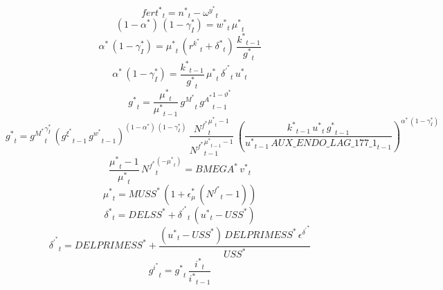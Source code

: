\begin{dmath}
{{fert^*}}_{t}={{n^*}}_{t}-{{\omega^y^*}}_{t}
\end{dmath}
\begin{dmath}
\left(1-{{\alpha^*}}\right)\, \left(1-{{\gamma_I^*}}\right)={{w^*}}_{t}\, {{\mu^*}}_{t}
\end{dmath}
\begin{dmath}
{{\alpha^*}}\, \left(1-{{\gamma_I^*}}\right)={{\mu^*}}_{t}\, \left({{r^k^*}}_{t}+{{\delta^*}}_{t}\right)\, \frac{{{k^*}}_{t-1}}{{{g^*}}_{t}}
\end{dmath}
\begin{dmath}
{{\alpha^*}}\, \left(1-{{\gamma_I^*}}\right)=\frac{{{k^*}}_{t-1}}{{{g^*}}_{t}}\, {{\mu^*}}_{t}\, {{\delta^\prime^*}}_{t}\, {{u^*}}_{t}
\end{dmath}
\begin{dmath}
{{g^*}}_{t}=\frac{{{\mu^*}}_{t}}{{{\mu^*}}_{t-1}}\, {{g^M^*}}_{t}\, {{g^A^*}}_{t-1}^{1-{{\vartheta^*}}}
\end{dmath}
\begin{dmath}
{{g^*}}_{t}={{g^M^*}}_{t}^{{{\gamma_I^*}}}\, \left({{g^{\xi}^*}}_{t-1}\, {{g^w^*}}_{t-1}\right)^{\left(1-{{\alpha^*}}\right)\, \left(1-{{\gamma_I^*}}\right)}\, \frac{{{N^f^*}}_{t}^{{{\mu^*}}_{t}-1}}{{{N^f^*}}_{t-1}^{{{\mu^*}}_{t-1}-1}}\, \left(\frac{{{k^*}}_{t-1}\, {{u^*}}_{t}\, {{g^*}}_{t-1}}{{{u^*}}_{t-1}\, {AUX\_ENDO\_LAG\_177\_1}_{t-1}}\right)^{{{\alpha^*}}\, \left(1-{{\gamma_I^*}}\right)}
\end{dmath}
\begin{dmath}
\frac{{{\mu^*}}_{t}-1}{{{\mu^*}}_{t}}\, {{N^f^*}}_{t}^{\left(-{{\mu^*}}_{t}\right)}={{BMEGA^*}}\, {{v^*}}_{t}
\end{dmath}
\begin{dmath}
{{\mu^*}}_{t}={{MUSS^*}}\, \left(1+{{\epsilon_{\mu}^*}}\, \left({{N^f^*}}_{t}-1\right)\right)
\end{dmath}
\begin{dmath}
{{\delta^*}}_{t}={{DELSS^*}}+{{\delta^\prime^*}}_{t}\, \left({{u^*}}_{t}-{{USS^*}}\right)
\end{dmath}
\begin{dmath}
{{\delta^\prime^*}}_{t}={{DELPRIMESS^*}}+\frac{\left({{u^*}}_{t}-{{USS^*}}\right)\, {{DELPRIMESS^*}}\, {{\epsilon^{\delta^{\prime}}^*}}}{{{USS^*}}}
\end{dmath}
\begin{dmath}
{{g^i^*}}_{t}={{g^*}}_{t}\, \frac{{{i^*}}_{t}}{{{i^*}}_{t-1}}
\end{dmath}
